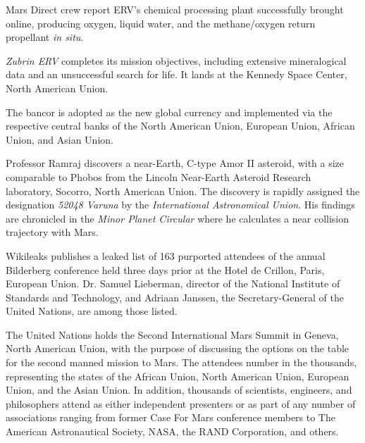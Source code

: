 Mars Direct crew report ERV's chemical processing plant successfully brought online, producing oxygen, liquid water, and the methane/oxygen return propellant {\it in situ}.
\StopTimelineDate

{\it Zubrin ERV} completes its mission objectives, including extensive mineralogical data and an unsuccessful search for life. It lands at the Kennedy Space Center, North American Union.
\StopTimelineDate

The bancor is adopted as the new global currency and implemented via the respective central banks of the North American Union, European Union, African Union, and Asian Union.
\StopTimelineDate

Professor Ramraj discovers a near-Earth, C-type Amor II asteroid, with a size comparable to Phobos from the Lincoln Near-Earth Asteroid Research laboratory, Socorro, North American Union. The discovery is rapidly assigned the designation {\it 52048 Varuna} by the {\it International Astronomical Union}. His findings are chronicled in the {\it Minor Planet Circular} where he calculates a near collision trajectory with Mars.
\StopTimelineDate

Wikileaks publishes a leaked list of 163 purported attendees of the annual Bilderberg conference held three days prior at the Hotel de Crillon, Paris, European Union. Dr. Samuel Lieberman, director of the National Institute of Standards and Technology, and Adriaan Janssen, the Secretary-General of the United Nations, are among those listed.
\StopTimelineDate

The United Nations holds the Second International Mars Summit in Geneva, North American Union, with the purpose of discussing the options on the table for the second manned mission to Mars. The attendees number in the thousands, representing the states of the African Union, North American Union, European Union, and the Asian Union. In addition, thousands of scientists, engineers, and philosophers attend as either independent presenters or as part of any number of associations ranging from former Case For Mars conference members to The American Astronautical Society, NASA, the RAND Corporation, and others.

